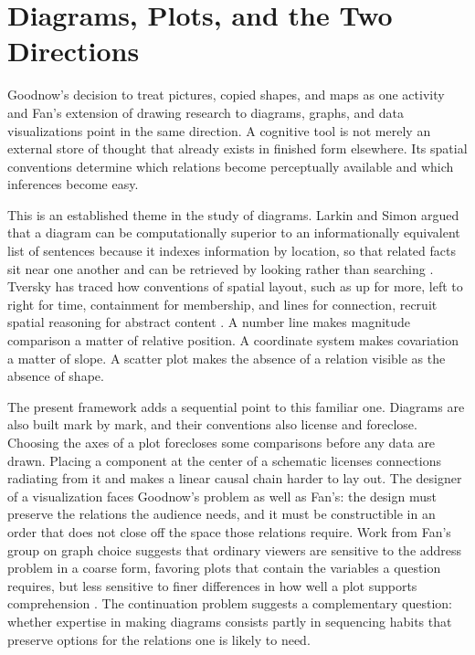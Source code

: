 \documentclass[11pt]{article}
\theoremstyle{remark}
\begin{document}
\section{Diagrams, Plots, and the Two Directions}
\label{sec:tools}

Goodnow's decision to treat pictures, copied shapes, and maps as one activity and Fan's extension of drawing research to diagrams, graphs, and data visualizations point in the same direction. A cognitive tool is not merely an external store of thought that already exists in finished form elsewhere. Its spatial conventions determine which relations become perceptually available and which inferences become easy.

This is an established theme in the study of diagrams. Larkin and Simon argued that a diagram can be computationally superior to an informationally equivalent list of sentences because it indexes information by location, so that related facts sit near one another and can be retrieved by looking rather than searching \cite{larkin1987}. Tversky has traced how conventions of spatial layout, such as up for more, left to right for time, containment for membership, and lines for connection, recruit spatial reasoning for abstract content \cite{tversky2011}. A number line makes magnitude comparison a matter of relative position. A coordinate system makes covariation a matter of slope. A scatter plot makes the absence of a relation visible as the absence of shape.

The present framework adds a sequential point to this familiar one. Diagrams are also built mark by mark, and their conventions also license and foreclose. Choosing the axes of a plot forecloses some comparisons before any data are drawn. Placing a component at the center of a schematic licenses connections radiating from it and makes a linear causal chain harder to lay out. The designer of a visualization faces Goodnow's problem as well as Fan's: the design must preserve the relations the audience needs, and it must be constructible in an order that does not close off the space those relations require. Work from Fan's group on graph choice suggests that ordinary viewers are sensitive to the address problem in a coarse form, favoring plots that contain the variables a question requires, but less sensitive to finer differences in how well a plot supports comprehension \cite{huey2023plots}. The continuation problem suggests a complementary question: whether expertise in making diagrams consists partly in sequencing habits that preserve options for the relations one is likely to need.
\end{document}
